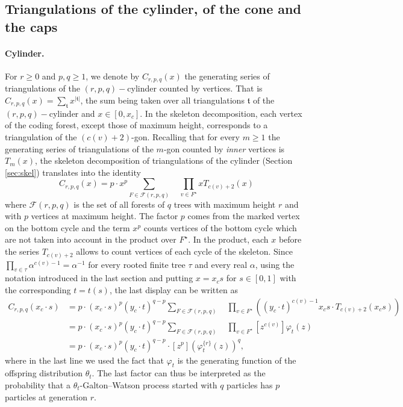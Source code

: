 \documentclass[AHL,XML,longabstracts,Unicode,NoSaveZebib]{cedram}
\begin{document}
\subsection{Triangulations of the cylinder, of the cone and the caps}

\paragraph{Cylinder.} For $r \geq 0$ and $p, q\geq 1$, we denote by $C_{r,p,q}(x)$ the generating series of triangulations of the $(r,p,q)-$cylinder counted by vertices. That is $C_{r,p,q}(x) = \sum_{\mathfrak t} x^{|\mathfrak t|}$, the sum being taken over all triangulations $\mathfrak t$ of the $(r,p,q)-$cylinder and $x \in [0,x_{c}]$. In the skeleton decomposition, each vertex of the coding forest, except those of maximum height, corresponds to a triangulation of the $(c(v)+2)$-gon. Recalling that for every $m \geq 1$ the generating series of triangulations of the $m$-gon counted by \emph{inner} vertices is $T_m(x)$, the skeleton decomposition of triangulations of the cylinder (Section \ref{sec:skel}) translates into the identity
\[
C_{r,p,q}(x) = p \cdot x^p \sum_{F \in \mathcal{F}(r,p,q)} \quad \prod_{v \in F^\star} x T_{c(v)+2}(x)
\]
where $\mathcal{F}(r,p,q)$ is the set of all forests of $q$ trees with maximum height $r$ and with $p$ vertices at maximum height. The factor $p$ comes from the marked vertex on the bottom cycle and the term $x^p$ counts vertices of the bottom cycle which are not taken into account in the product over $F^\star$. In the product, each $x$ before the series $T_{c(v)+2}$ allows to count vertices of each cycle of the skeleton. Since $\prod_{v \in \tau} \alpha^{c(v) -1} = \alpha^{-1}$ for every rooted finite tree $\tau$ and every real $\alpha$, using the notation introduced in the last section and putting $x = x_{c}s$ for $s \in [0,1]$ with the corresponding $t=t(s)$, the last display can be written as
\begin{align}
C_{r,p,q}(x_c \cdot s) &= p \cdot (x_c \cdot s)^p (y_c \cdot t)^{q-p} \sum_{F \in \mathcal{F}(r,p,q)} \quad \prod_{v \in F^\star}
\left( (y_c \cdot t )^{c(v)-1} x_c s \cdot T_{c(v) + 2}(x_c s) \right)\nonumber \\
&=p \cdot (x_c \cdot s)^p (y_c \cdot t)^{q-p} \sum_{F \in \mathcal{F}(r,p,q)} \quad \prod_{v \in F^\star}
\left[ z^{c(v)}  \right]\varphi_t(z)\nonumber \\
\label{eq:gencylinder}
 &=
p \cdot (x_c \cdot s)^p (y_c \cdot t)^{q-p}
\cdot \left[ z^p  \right] \left(\varphi_t^{\{r\}} (z) \right)^q,
\end{align}
where in the last line we used the fact that $\varphi_{t}$ is the generating function of the offspring distribution $\theta_{t}$. The last factor can thus be  interpreted as the probability that a $\theta_{t}$-Galton--Watson process started with $q$ particles has $p$ particles at generation $r$.
\end{document}
